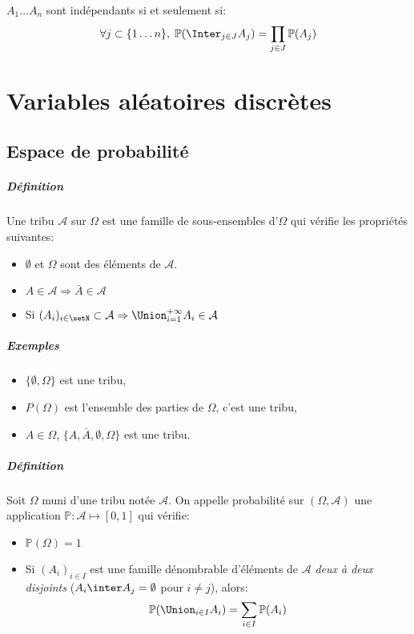 \documentclass[a4paper,10pt,french,openany]{memoir}
\newcommand{\Proba}{\mathbb{P}}
\newcommand{\tribu}[1]{\mathcal{#1}}
\newcommand{\implique}{\Rightarrow}
\begin{document}
$A_1 \dots A_n$ sont indépendants si et seulement si:
\[\forall j \subset \lbrace 1 \dots n \rbrace, \; \Proba(\Inter_{j \in J} A_j) = \prod_{j \in J} \Proba(A_j)\]

\chapter{Variables aléatoires discrètes}

\section{Espace de probabilité}

\paragraph{Définition}
Une tribu $\tribu{A}$ sur $\Omega$ est une famille de sous-ensembles d'$\Omega$ qui vérifie les propriétés suivantes:

\begin{itemize}
 \item $\emptyset$ et $\Omega$ sont des éléments de $\tribu A$.
 \item $A \in \tribu A \implique \bar A \in \tribu A $
 \item Si $(A_i)_{i \in \setN} \subset \tribu A \implique \Union_{i=1}^{+\infty} A_i \in \tribu A$
\end{itemize}

\paragraph{Exemples}
\begin{itemize}
 \item $\{\emptyset, \Omega\}$ est une tribu,
 \item $P(\Omega)$ est l'ensemble des parties de $\Omega$, c'est une tribu,
 \item $A \in \Omega$, $\{ A, \bar A, \emptyset, \Omega \}$ est une tribu.
\end{itemize}

\paragraph{Définition}
Soit $\Omega$ muni d'une tribu notée $\tribu A$.
On appelle probabilité sur $(\Omega, \tribu A)$ une application 
\( \Proba: \tribu A \mapsto [0, 1] \)
qui vérifie:
\begin{itemize}
 \item $\Proba(\Omega) = 1$
 \item Si $(A_i)_{i \in I}$ est une famille dénombrable d'éléments de $\tribu A$ \emph{deux à deux disjoints} ($A_i \inter A_j = \emptyset$ pour $i \neq j$), alors:
 \[ \Proba(\Union_{i\in I} A_i) = \sum_{i\in I} \Proba(A_i) \]
\end{itemize}
\end{document}
